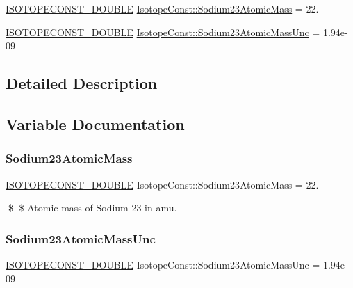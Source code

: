 \begin{DoxyCompactItemize}
\item 
\mbox{\hyperlink{group___isotope_const-_macros_ga8f45a7272ce02c0b4c65c44636ed719a}{I\+S\+O\+T\+O\+P\+E\+C\+O\+N\+S\+T\+\_\+\+D\+O\+U\+B\+LE}} \mbox{\hyperlink{group___isotope_const-_sodium-_na23_gaa9c529b0917944b980e1b148b6e84364}{Isotope\+Const\+::\+Sodium23\+Atomic\+Mass}} = 22.
\item 
\mbox{\hyperlink{group___isotope_const-_macros_ga8f45a7272ce02c0b4c65c44636ed719a}{I\+S\+O\+T\+O\+P\+E\+C\+O\+N\+S\+T\+\_\+\+D\+O\+U\+B\+LE}} \mbox{\hyperlink{group___isotope_const-_sodium-_na23_ga881b5121b64a9765b29a606c51834933}{Isotope\+Const\+::\+Sodium23\+Atomic\+Mass\+Unc}} = 1.\+94e-\/09
\end{DoxyCompactItemize}


\subsection{Detailed Description}


\subsection{Variable Documentation}
\mbox{\label{group___isotope_const-_sodium-_na23_gaa9c529b0917944b980e1b148b6e84364}} 
\subsubsection{\texorpdfstring{Sodium23\+Atomic\+Mass}{Sodium23AtomicMass}}
{\footnotesize\ttfamily \mbox{\hyperlink{group___isotope_const-_macros_ga8f45a7272ce02c0b4c65c44636ed719a}{I\+S\+O\+T\+O\+P\+E\+C\+O\+N\+S\+T\+\_\+\+D\+O\+U\+B\+LE}} Isotope\+Const\+::\+Sodium23\+Atomic\+Mass = 22.}

\$ \$ Atomic mass of Sodium-\/23 in amu. \mbox{\label{group___isotope_const-_sodium-_na23_ga881b5121b64a9765b29a606c51834933}} 
\subsubsection{\texorpdfstring{Sodium23\+Atomic\+Mass\+Unc}{Sodium23AtomicMassUnc}}
{\footnotesize\ttfamily \mbox{\hyperlink{group___isotope_const-_macros_ga8f45a7272ce02c0b4c65c44636ed719a}{I\+S\+O\+T\+O\+P\+E\+C\+O\+N\+S\+T\+\_\+\+D\+O\+U\+B\+LE}} Isotope\+Const\+::\+Sodium23\+Atomic\+Mass\+Unc = 1.\+94e-\/09}

